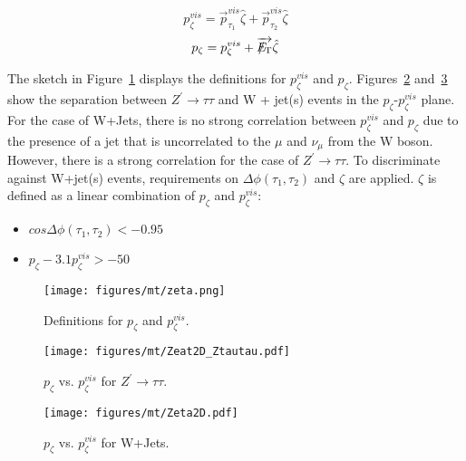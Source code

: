 \begin{equation}
   p_{\zeta}^{vis} = \overrightarrow{p}_{\tau_{1}}^{vis}\hat{\zeta}+\overrightarrow{p}_{\tau_{2}}^{vis}\hat{\zeta}
\label{eq:zetavis}
\end{equation}
\begin{equation}
   p_{\zeta} = p_{\zeta}^{vis}+\overrightarrow{{E\!\!\!\!/_{\rm T}}}\hat{\zeta}
\label{eq:zeta}
\end{equation}

The sketch in Figure~\ref{fig:ZetaDiagram} displays the definitions for $p_{\zeta}^{vis}$ and $p_{\zeta}$. Figures~\ref{fig:WjetsZeta1} and~\ref{fig:WjetsZeta2} 
show the separation between $Z^{\prime}\rightarrow\tau\tau$ and W + jet(s) events in the $p_{\zeta}$-$p_{\zeta}^{vis}$ plane. For the case of W+Jets, there is no 
strong correlation between $p_{\zeta}^{vis}$ and $p_{\zeta}$ due to the presence of a jet that is uncorrelated to the $\mu$ and $\nu_{\mu}$ from the W boson. 
However, there is a strong correlation for the case of $Z^{\prime} \to \tau\tau$. To discriminate against W+jet(s) events, requirements on $\Delta \phi 
(\tau_{1},\tau_{2})$ and $\zeta$ are applied. $\zeta$ is defined as a linear combination of $p_{\zeta}$ and $p_{\zeta}^{vis}$:

\begin{itemize}
  \item $cos\Delta\phi(\tau_{1},\tau_{2}) < -0.95$
  \item $p_{\zeta} - 3.1 p_{\zeta}^{vis} > -50$
\end{itemize}
\begin{figure}
\begin{center}
\texttt{[image: figures/mt/zeta.png]}
\caption{ Definitions for $p_{\zeta}$ and $p_{\zeta}^{vis}$.}
\label{fig:ZetaDiagram}
\end{center}
\end{figure}
\begin{figure}
\begin{center}
\texttt{[image: figures/mt/Zeat2D\_Ztautau.pdf]}
\caption{ $p_{\zeta}$ vs. $p_{\zeta}^{vis}$ for $Z^{\prime}\rightarrow\tau\tau$.}
\label{fig:WjetsZeta1}
\end{center}
\end{figure}
\begin{figure}
\begin{center}
\texttt{[image: figures/mt/Zeta2D.pdf]}
\caption{ $p_{\zeta}$ vs. $p_{\zeta}^{vis}$ for W+Jets.}
\label{fig:WjetsZeta2}
\end{center}
\end{figure}


